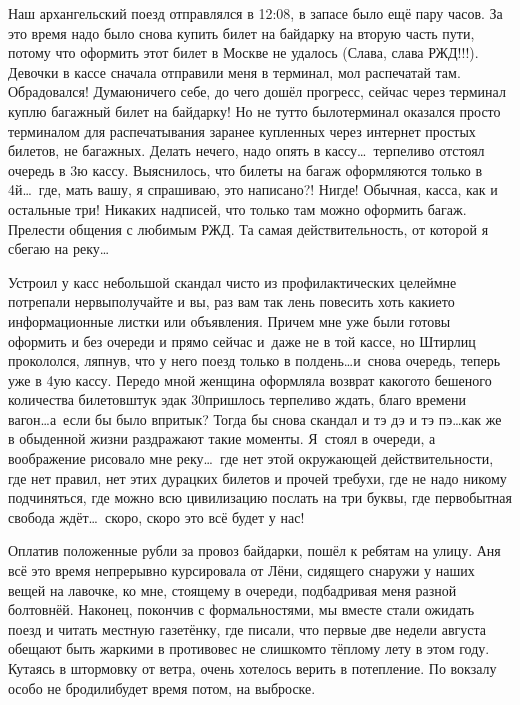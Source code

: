 Наш архангельский поезд отправлялся в 12:08, в запасе было ещё пару часов. За это время надо было снова купить билет на байдарку на вторую часть пути, потому что оформить этот билет в Москве не удалось (Слава, слава РЖД!!!). Девочки в кассе сначала отправили меня в терминал, мол распечатай там. Обрадовался! Думаю\mdash ничего себе, до чего дошёл прогресс, сейчас через терминал куплю багажный билет на байдарку! Но не тут\sdash то было\mdash терминал оказался просто терминалом для распечатывания заранее купленных через интернет простых билетов, не багажных. Делать нечего, надо опять в кассу\ldots~терпеливо отстоял очередь в 3\sdash ю кассу. Выяснилось, что билеты на багаж оформляются только в 4\sdash й\ldots~где, мать вашу, я спрашиваю, это написано?! Нигде! Обычная, касса, как и остальные три! Никаких надписей, что только там можно оформить багаж. Прелести общения с любимым РЖД. Та самая действительность, от которой я сбегаю на реку\ldots~

Устроил у касс небольшой скандал чисто из профилактических целей\mdash мне потрепали нервы\mdash получайте и вы, раз вам так лень повесить хоть какие\sdash то информационные листки или объявления. Причем мне уже были готовы оформить и без очереди и прямо сейчас и~даже не в той кассе, но Штирлиц прокололся, ляпнув, что у него поезд только в полдень\ldots и~снова очередь, теперь уже в 4\sdash ую кассу. Передо мной женщина оформляла возврат какого\sdash то бешеного количества билетов\mdash штук эдак 30\mdash пришлось терпеливо ждать, благо времени вагон\ldots а~если бы было впритык? Тогда бы снова скандал и тэ дэ и тэ пэ\ldots как же в обыденной жизни раздражают такие моменты. Я~стоял в очереди, а воображение рисовало мне реку\ldots~где нет этой окружающей действительности, где нет правил, нет этих дурацких билетов и прочей требухи, где не надо никому подчиняться, где можно всю цивилизацию послать на три буквы, где первобытная свобода ждёт\ldots~скоро, скоро это всё будет у нас!

Оплатив положенные рубли за провоз байдарки, пошёл к ребятам на улицу. Аня всё это время непрерывно курсировала от Лёни, сидящего снаружи у наших вещей на лавочке, ко мне, стоящему в очереди, подбадривая меня разной болтовнёй. Наконец, покончив с формальностями, мы вместе стали ожидать поезд и читать местную газетёнку, где писали, что первые две недели августа обещают быть жаркими в противовес не слишком\sdash то тёплому лету в этом году. Кутаясь в штормовку от ветра, очень хотелось верить в потепление. По вокзалу особо не бродили\mdash будет время потом, на выброске.
 

